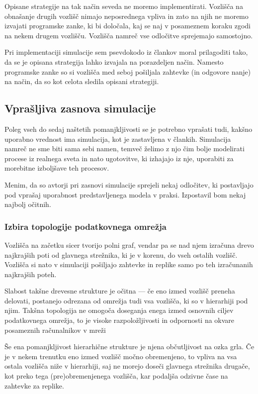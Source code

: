 \documentclass[a4paper, 12pt]{book}
\begin{document}
Opisane strategije na tak način seveda ne moremo implementirati. Vozlišča na
obnašanje drugih vozlišč nimajo neposrednega vpliva in zato na njih ne moremo
izvajati programske zanke, ki bi določala, kaj se naj v posameznem koraku zgodi
na nekem drugem vozlišču. Vozlišča namreč vse odločitve sprejemajo samostojno.

Pri implementaciji simulacije sem psevdokodo iz člankov moral prilagoditi tako,
da se je opisana strategija lahko izvajala na porazdeljen način. Namesto
programske zanke so si vozlišča med seboj pošiljala zahtevke (in odgovore
nanje) na način, da so kot celota sledila opisani strategiji.


\subsection{Vprašljiva zasnova simulacije}

Poleg vseh do sedaj naštetih pomanjkljivosti se je potrebno vprašati tudi,
kakšno uporabno vrednost ima simulacija, kot je zastavljena v člankih.
Simulacija namreč ne sme biti sama sebi namen, temveč želimo z njo čim bolje
modelirati procese iz realnega sveta in nato ugotovitve, ki izhajajo iz nje,
uporabiti za morebitne izboljšave teh procesov.

Menim, da so avtorji pri zasnovi simulacije sprejeli nekaj odločitev, ki
postavljajo pod vprašaj uporabnost predstavljenega modela v praksi. Izpostavil
bom nekaj najbolj očitnih.

\subsubsection{Izbira topologije podatkovnega omrežja}

Vozlišča na začetku sicer tvorijo polni graf, vendar pa se nad njem izračuna
drevo najkrajših poti od glavnega strežnika, ki je v korenu, do vseh ostalih
vozlišč. Vozlišča si nato v simulaciji pošiljajo zahtevke in replike samo po
teh izračunanih najkrajših poteh.

Slabost takšne drevesne strukture je očitna --- če eno izmed vozlišč
preneha delovati, postanejo odrezana od omrežja tudi vsa vozlišča, ki so v
hierarhiji pod njim. Takšna topologija ne omogoča doseganja enega izmed
osnovnih ciljev podatkovnega omrežja, to je visoke razpoložljivosti in
odpornosti na okvare posameznih računalnikov v mreži

Še ena pomanjkljivost hierarhične strukture je njena občutljivost na ozka grla.
Če je v nekem trenutku eno izmed vozlišč močno obremenjeno, to vpliva na vsa
ostala vozlišča niže v hierarhiji, saj ne morejo doseči glavnega strežnika
drugače, kot preko tega (pre)obremenjenega vozlišča, kar podaljša odzivne
čase na zahtevke za replike.
\end{document}
